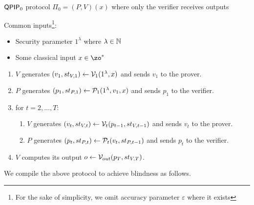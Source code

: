 \begin{protocol}{$\operatorname{\mathsf{QPIP}}_0$ protocol $\Pi_0=(P, V)(x)$ where only the verifier receives outputs}
	
	Common inputs\footnote{For the sake of simplicity, we omit accuracy parameter $\varepsilon$ where it exists}:
	\begin{itemize}
		\item Security parameter $1^\lambda$ where $\lambda\in\mathbb{N}$
		\item Some classical input $x\in\zo^*$ 
	\end{itemize}

	\begin{enumerate}
		\item $V$ generates $(v_1, st_{V, 1})\leftarrow\mathcal{V}_1(1^\lambda, x)$ and sends $v_1$ to the prover.
		\item $P$ generates $(p_1, st_{P, 1})\leftarrow\mathcal{P}_1(1^\lambda, v_1, x)$ and sends $p_1$ to the verifier.
		\item for $t=2,\ldots,T$:
		\begin{enumerate}
			\item $V$ generates $(v_t, st_{V, t})\leftarrow\mathcal{V}_t(p_{t-1}, st_{V, t-1})$ and sends $v_t$ to the prover.
			\item $P$ generates $(p_t, st_{P, t})\leftarrow\mathcal{P}_t(v_t, st_{P, t-1})$ and sends $p_t$ to the verifier.
		\end{enumerate}
		\item $V$ computes its output $o\leftarrow\mathcal{V}_{out}(p_T, st_{V, T})$.
	\end{enumerate}

\end{protocol}

We compile the above protocol to achieve blindness as follows.

